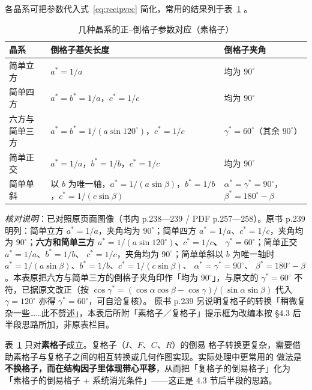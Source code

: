 各晶系可把参数代入式~\eqref{eq:recipvec} 简化，常用的结果列于表~\ref{tab:recip-simple}
。

\begin{table}[htbp]
\centering
\caption{几种晶系的正--倒格子参数对应（素格子）}
\label{tab:recip-simple}
{\srcsize
\begin{tabularx}{\columnwidth}{@{}lXX@{}}
\toprule
晶系 & 倒格子基矢长度 & 倒格子夹角 \\
\midrule
简单立方 & $a^{*}=1/a$ & 均为 $90^{\circ}$ \\
简单四方 & $a^{*}=b^{*}=1/a$，$c^{*}=1/c$ & 均为 $90^{\circ}$ \\
六方与简单三方 & $a^{*}=b^{*}=1/(a\sin120^{\circ})$，$c^{*}=1/c$ & $\gamma^{*}=60^{\circ}$（其余 $90^{\circ}$） \\
简单正交 & $a^{*}=1/a$，$b^{*}=1/b$，$c^{*}=1/c$ & 均为 $90^{\circ}$ \\
简单单斜 & 以 $b$ 为唯一轴，$a^{*}=1/(a\sin\beta)$，$b^{*}=1/b$，$c^{*}=1/(c\sin\beta)$ & $\alpha^{*}=\gamma^{*}=90^{\circ}$，$\beta^{*}=180^{\circ}-\beta$ \\
\bottomrule
\end{tabularx}}
\end{table}

\emph{核对说明}：已对照原页面图像（书内 p.238—239 / PDF p.257—258）。原书
p.239 明列：简单立方 $a^{*}=1/a$，夹角均为 $90^{\circ}$；简单四方
$a^{*}=1/a$、$c^{*}=1/c$，夹角均为 $90^{\circ}$；\textbf{六方和简单三方
$a^{*}=1/(a\sin120^{\circ})$、$c^{*}=1/c$、
$\gamma^{*}=60^{\circ}$}；简单正交 $a^{*}=1/a$、$b^{*}=1/b$、
$c^{*}=1/c$，夹角均为 $90^{\circ}$；简单单斜以 $b$ 为唯一轴时
$a^{*}=1/(a\sin\beta)$、$b^{*}=1/b$、$c^{*}=1/(c\sin\beta)$、
$\alpha^{*}=\gamma^{*}=90^{\circ}$、
$\beta^{*}=180^{\circ}-\beta$。本表原把六方与简单三方的倒格子夹角印作「均为
$90^{\circ}$」，与原文的 $\gamma^{*}=60^{\circ}$ 不符，已据原文改正（按
$\cos\gamma^{*}=(\cos\alpha\cos\beta-\cos\gamma)/(\sin\alpha\sin\beta)$
代入 $\gamma=120^{\circ}$ 亦得 $\gamma^{*}=60^{\circ}$，可自洽复核）。
原书 p.239 另说明复格子的转换「稍微复杂一些……此不赘述」，本表后所附「素格子／复格子」提示框为改编本按
§4.3 后半段思路所加，非原表栏目。


\begin{keycond}
表~\ref{tab:recip-simple} 只对\textbf{素格子}成立。复格子（$I$、$F$、$C$、$R$）的倒易
格子转换更复杂，需要借助素格子与复格子之间的相互转换或几何作图实现。实际处理中更常用的
做法是\textbf{不换格子，而在结构因子里体现带心平移}，从而把「复格子的倒易格子」化为
「素格子的倒易格子 $+$ 系统消光条件」——这正是 4.3 节后半段的思路。
\end{keycond}


